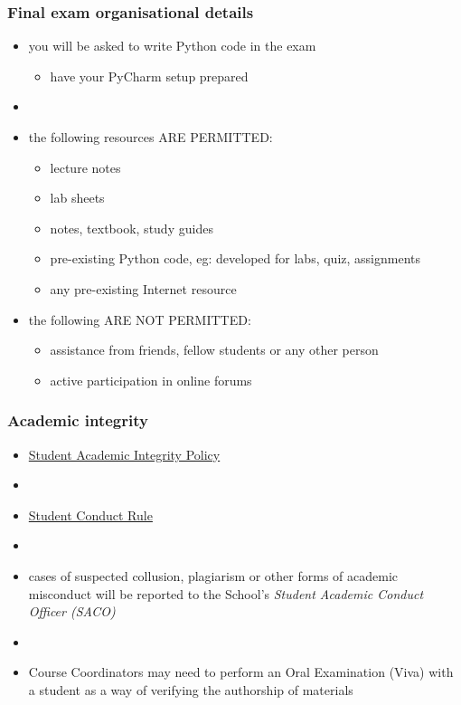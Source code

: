 \documentclass[english,14pt]{beamer}
\begin{document}
\begin{frame}[fragile]

\frametitle{Final exam organisational details}

\begin{itemize}
	\item you will be asked to write Python code in the exam
	\begin{itemize}
		\item have your PyCharm setup prepared
	\end{itemize}
	\item[]
	\item the following resources ARE PERMITTED:
	\begin{itemize}
		\item lecture notes
		\item lab sheets
		\item notes, textbook, study guides
		\item pre-existing Python code, eg: developed for labs, quiz, assignments
		\item any pre-existing Internet resource
	\end{itemize}

	\item the following ARE NOT PERMITTED:
	\begin{itemize}
		\item assistance from friends, fellow students or any other person
		\item active participation in online forums
	\end{itemize}
	
\end{itemize}

\end{frame}


\begin{frame}[fragile]

\frametitle{Academic integrity}

\begin{itemize}
	\item \href{https://policies.newcastle.edu.au/document/view-current.php?id=35&version=1}{Student Academic Integrity Policy}
	\item[]
	\item \href{https://policies.newcastle.edu.au/document/view-current.php?id=34}{Student Conduct Rule}
	\item[]
	\item cases of suspected collusion, plagiarism or other forms of academic misconduct will be reported to the School's \emph{Student Academic Conduct Officer (SACO)}
	\item[]
	\item Course Coordinators may need to perform an Oral Examination (Viva) with a student as a way of verifying the authorship of materials
\end{itemize}

\end{frame}
\end{document}
